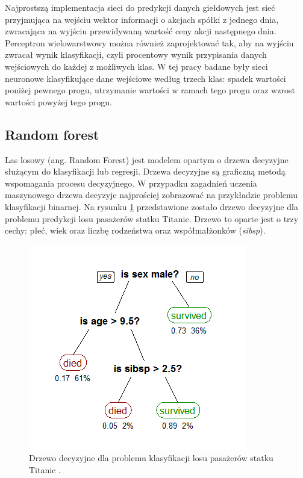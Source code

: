 \documentclass[a4paper, twoside, 11pt, openright]{article}
\begin{document}
Najprostszą implementacja sieci do predykcji danych giełdowych jest sieć przyjmująca na wejściu wektor informacji o akcjach spółki z jednego dnia, zwracająca na wyjściu przewidywaną wartość ceny akcji następnego dnia. Perceptron wielowarstwowy można również zaprojektować tak, aby na wyjściu zwracał wynik klasyfikacji, czyli procentowy wynik przypisania danych wejściowych do każdej z możliwych klas. W tej pracy badane były sieci neuronowe klasyfikujące dane wejściowe według trzech klas: spadek wartości poniżej pewnego progu, utrzymanie wartości w ramach tego progu oraz wzrost wartości powyżej tego progu. 

\subsection{Random forest}

Las losowy (ang. Random Forest)\cite{randforest} jest modelem opartym o drzewa decyzyjne służącym do klasyfikacji lub regresji. Drzewa decyzyjne są graficzną metodą wspomagania procesu decyzyjnego. W przypadku zagadnień uczenia maszynowego drzewa decyzyje najprościej zobrazować na przykładzie problemu klasyfikacji binarnej. Na rysunku \ref{img:wiki_dec_tree} przedstawione zostało drzewo decyzyjne dla problemu predykcji losu pasażerów statku Titanic. Drzewo to oparte jest o trzy cechy: płeć, wiek oraz liczbę rodzeństwa oraz współmałżonków (\textit{sibsp}). 

\begin{figure}[H]
\centering \includegraphics[scale=0.7]{img/decision_tree.png}
\caption{Drzewo decyzyjne dla problemu klasyfikacji losu pasażerów statku Titanic \cite{wikidecisiontree}.}
\label{img:wiki_dec_tree}
\end{figure}
\end{document}

